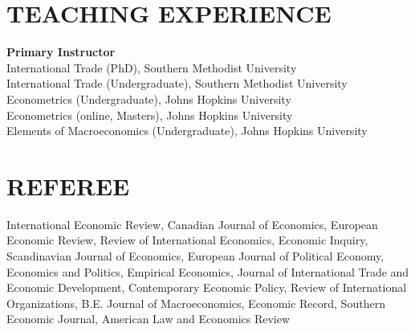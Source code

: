 \documentclass[11pt]{res}
\begin{document}
\begin{resume}
\section{TEACHING EXPERIENCE} \vspace{1.5mm}
{\bf Primary Instructor}\vspace{1.5mm}\\
International Trade (PhD), Southern Methodist University\vspace{1.5mm}\\
International Trade (Undergraduate), Southern Methodist University\vspace{1.5mm}\\


\phantom{.}\vspace{.05cm}
Econometrics (Undergraduate), Johns Hopkins University\vspace{1.5mm}\\
Econometrics (online, Masters), Johns Hopkins University\vspace{1.5mm}\\
Elements of Macroeconomics (Undergraduate), Johns Hopkins University\vspace{1.5mm}\\

\section{REFEREE} \vspace{1.5mm}
International Economic Review, Canadian Journal of Economics, European Economic Review, Review of International Economics, 
Economic Inquiry, Scandinavian Journal of Economics, European Journal of Political Economy, Economics and Politics, Empirical Economics, Journal of International Trade and Economic Development, Contemporary Economic Policy, Review of International Organizations, B.E. Journal of Macroeconomics, Economic Record, Southern Economic Journal, American Law and Economics Review
\end{resume}
\end{document}
